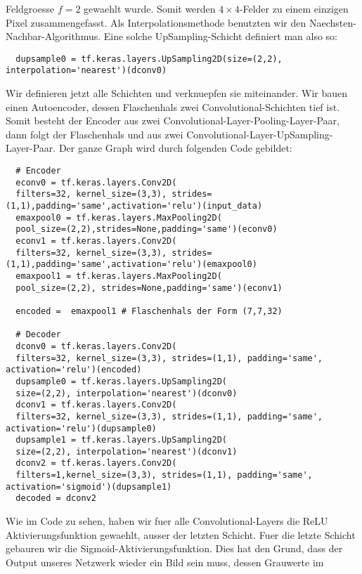 Feldgroesse $f = 2$ gewaehlt wurde. Somit werden $4 \times 4$-Felder zu einem
einzigen Pixel zusammengefasst. Als Interpolationsmethode benutzten wir den Naechsten-Nachbar-Algorithmus.
Eine solche UpSampling-Schicht definiert man also so:
\begin{verbatim}
  dupsample0 = tf.keras.layers.UpSampling2D(size=(2,2), interpolation='nearest')(dconv0)
\end{verbatim}
Wir definieren jetzt alle Schichten und verknuepfen sie miteinander. Wir bauen
einen Autoencoder, dessen Flaschenhals zwei Convolutional-Schichten tief ist.
Somit besteht der Encoder aus zwei Convolutional-Layer-Pooling-Layer-Paar, dann
folgt der Flaschenhals und aus zwei Convolutional-Layer-UpSampling-Layer-Paar.
Der ganze Graph wird durch folgenden Code gebildet:
\begin{verbatim}
  # Encoder
  econv0 = tf.keras.layers.Conv2D(
  filters=32, kernel_size=(3,3), strides=(1,1),padding='same',activation='relu')(input_data)
  emaxpool0 = tf.keras.layers.MaxPooling2D(
  pool_size=(2,2),strides=None,padding='same')(econv0)
  econv1 = tf.keras.layers.Conv2D(
  filters=32, kernel_size=(3,3), strides=(1,1),padding='same',activation='relu')(emaxpool0)
  emaxpool1 = tf.keras.layers.MaxPooling2D(
  pool_size=(2,2), strides=None,padding='same')(econv1)

  encoded =  emaxpool1 # Flaschenhals der Form (7,7,32)

  # Decoder
  dconv0 = tf.keras.layers.Conv2D(
  filters=32, kernel_size=(3,3), strides=(1,1), padding='same', activation='relu')(encoded)
  dupsample0 = tf.keras.layers.UpSampling2D(
  size=(2,2), interpolation='nearest')(dconv0)
  dconv1 = tf.keras.layers.Conv2D(
  filters=32, kernel_size=(3,3), strides=(1,1), padding='same', activation='relu')(dupsample0)
  dupsample1 = tf.keras.layers.UpSampling2D(
  size=(2,2), interpolation='nearest')(dconv1)
  dconv2 = tf.keras.layers.Conv2D(
  filters=1,kernel_size=(3,3), strides=(1,1), padding='same', activation='sigmoid')(dupsample1)
  decoded = dconv2
\end{verbatim}
Wie im Code zu sehen, haben wir fuer alle Convolutional-Layers die ReLU
Aktivierungsfunktion gewaehlt, ausser der letzten Schicht. Fuer die letzte
Schicht gebauren wir die Sigmoid-Aktivierungsfunktion. Dies hat den Grund, dass
der Output unseres Netzwerk wieder ein Bild sein muss, dessen Grauwerte im
